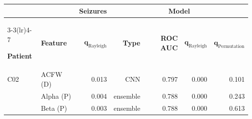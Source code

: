 \begin{tabular}{llrrrrr}
    \toprule
     &  & \textbf{Seizures} & \multicolumn{4}{c}{\textbf{Model}} \\
        \cmidrule(lr){3-3}\cmidrule(lr){4-7}

    \textbf{Patient} & \textbf{Feature}  & $\boldsymbol{q_{\mathrm{Rayleigh}}}$ & \textbf{Type} & \textbf{ROC AUC} & $\boldsymbol{q_{\mathrm{Rayleigh}}}$ & $\boldsymbol{q_{\mathrm{Permutation}}}$ \\
    \midrule

    \rowcolor{white}C02 & ACFW (D) & 0.013 & CNN & 0.797 & 0.000 & 0.101 \\
    \rowcolor{gray!10}\multirow[t]{2}{*}{U17} & Alpha (P) & 0.004 & ensemble & 0.788 & 0.000 & 0.243 \\
    \rowcolor{gray!10} & Beta (P) & 0.003 & ensemble & 0.788 & 0.000 & 0.613 \\

    \bottomrule
\end{tabular}
